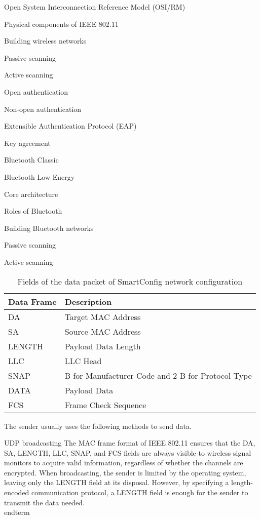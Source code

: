 \documentclass[a4paper,12pt]{book}
\begin{document}
\begin{term}{Open System Interconnection Reference Model (OSI/RM)}
\begin{term}{Physical components of IEEE 802.11}
\begin{term}{Building wireless networks}
\begin{term}{Passive scanning}
\begin{term}{Active scanning}
\begin{term}{Open authentication}
\begin{term}{Non-open authentication}
\begin{term}{Extensible Authentication Protocol (EAP)}
\begin{term}{Key agreement}
\begin{term}{Bluetooth Classic}
\begin{term}{Bluetooth Low Energy}
\begin{term}{Core architecture}
\begin{term}{Roles of Bluetooth}
\begin{term}{Building Bluetooth networks}
\begin{term}{Passive scanning}
\begin{term}{Active scanning}
\begin{table}[h!]
    \renewcommand{\arraystretch}{1.4}
    \caption{Fields of the data packet of SmartConfig network configuration}
    \begin{tabular}{|>{\Centering}m{}|>{\Centering}m{}|}
        \hline
        \rowcolor{LightBlue} \textbf{Data Frame}&\textbf{Description}\\
        \hline
        DA&Target MAC Address\\
        \hline
        SA&Source MAC Address\\
        \hline
        LENGTH&Payload Data Length\\
        \hline
        LLC&LLC Head\\
        \hline
        SNAP&3 B for Manufacturer Code and 2 B for Protocol Type\\
        \hline
        DATA&Payload Data\\
        \hline
        FCS&Frame Check Sequence\\
        \hline
    \end{tabular}
\end{table}

The sender usually uses the following methods to send data.

\begin{term}{UDP broadcasting}
    The MAC frame format of IEEE 802.11 ensures that the DA, SA, LENGTH, LLC, SNAP, and FCS fields are always visible to wireless signal monitors to acquire valid information, regardless of whether the channels are encrypted. When broadcasting, the sender is limited by the operating system, leaving only the LENGTH field at its disposal. However, by specifying a length-encoded communication protocol, a LENGTH field is enough for the sender to transmit the data needed.
\\end{term}{}


\end{term}
\end{term}
\end{term}
\end{term}
\end{term}
\end{term}
\end{term}
\end{term}
\end{term}
\end{term}
\end{term}
\end{term}
\end{term}
\end{term}
\end{term}
\end{term}
\end{term}
\end{document}
